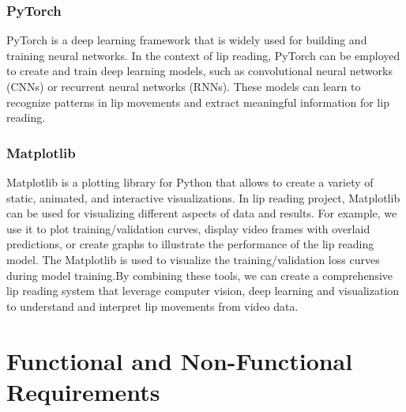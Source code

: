 \subsubsection{PyTorch}
PyTorch is a deep learning framework that is widely used for building and training neural networks. In the context of lip reading, PyTorch can be employed to create and train deep learning models, such as convolutional neural networks (CNNs) or recurrent neural networks (RNNs). These models can learn to recognize patterns in lip movements and extract meaningful information for lip reading.
\subsubsection{Matplotlib}
Matplotlib is a plotting library for Python that allows  to create a variety of static, animated, and interactive visualizations. In  lip reading project, Matplotlib can be used for visualizing different aspects of  data and results. For example, we use it to plot training/validation curves, display video frames with overlaid predictions, or create graphs to illustrate the performance of the lip reading model. The Matplotlib is used to visualize the training/validation loss curves during model training.By combining these tools, we can create a comprehensive lip reading system that leverage computer vision, deep learning and visualization to understand and interpret lip movements from video data.

\section{Functional and Non-Functional Requirements}
